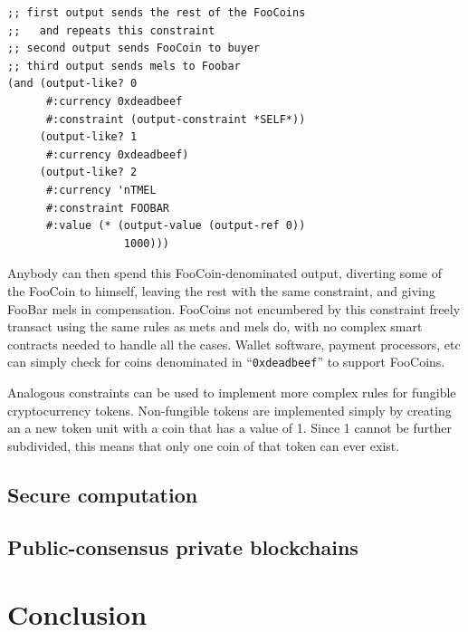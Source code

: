 \documentclass[headinclude]{scrbook}
\begin{document}
\begin{lstlisting}
;; first output sends the rest of the FooCoins
;;   and repeats this constraint
;; second output sends FooCoin to buyer
;; third output sends mels to Foobar
(and (output-like? 0
      #:currency 0xdeadbeef
      #:constraint (output-constraint *SELF*))
     (output-like? 1
      #:currency 0xdeadbeef)
     (output-like? 2
      #:currency 'nTMEL
      #:constraint FOOBAR
      #:value (* (output-value (output-ref 0))
                  1000)))
\end{lstlisting}

Anybody can then spend this FooCoin-denominated output, diverting some of the FooCoin to himself, leaving the rest with the same constraint, and giving FooBar mels in compensation. FooCoins not encumbered by this constraint freely transact using the same rules as mets and mels do, with no complex smart contracts needed to handle all the cases. Wallet software, payment processors, etc can simply check for coins denominated in ``\texttt{0xdeadbeef}'' to support FooCoins.

Analogous constraints can be used to implement more complex rules for fungible cryptocurrency tokens. Non-fungible tokens are implemented simply by creating an a new token unit with a coin that has a value of 1. Since 1 cannot be further subdivided, this means that only one coin of that token can ever exist.  

\section{Secure computation}



\section{Public-consensus private blockchains}

\chapter{Conclusion}


\printbibliography
\end{document}
